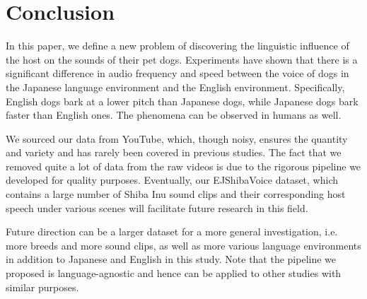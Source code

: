 \section{Conclusion}
\label{sec:conclusion}
In this paper, we define a new problem of discovering the linguistic influence of 
the host on the sounds of their pet dogs. Experiments have shown that there is a 
significant difference in audio frequency and speed between the voice of dogs 
in the Japanese language environment and the English environment. 
Specifically, English dogs bark at a lower pitch than Japanese dogs, while Japanese dogs bark
faster than English ones. The phenomena can be observed in humans as well.

We sourced our data from YouTube, which, though noisy, ensures the quantity and variety and has 
rarely been covered in previous studies. The fact that we removed quite a lot of data from
the raw videos is due to the rigorous pipeline we developed for quality purposes. 
Eventually, our EJShibaVoice dataset, which contains a large number of Shiba Inu sound clips 
and their corresponding host speech under various scenes will facilitate future research in 
this field.   

Future direction can be a larger dataset for a more general investigation, i.e. more breeds and 
more sound clips, as well as more various language environments in addition to Japanese 
and English in this study. Note that the pipeline we proposed is language-agnostic and hence 
can be applied to other studies with similar purposes. 

